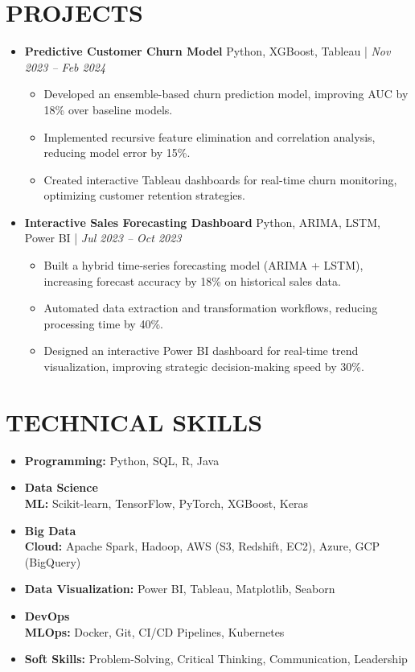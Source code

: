 \documentclass[letterpaper,11pt]{article}
\begin{document}
\section{\textbf{PROJECTS}}
  \begin{itemize}[leftmargin=0.15in, label={}]
    \item \textbf{Predictive Customer Churn Model} \hfill Python, XGBoost, Tableau | \textit{Nov 2023 – Feb 2024}
    \begin{itemize}
        \item Developed an ensemble-based churn prediction model, improving AUC by 18\% over baseline models.
        \item Implemented recursive feature elimination and correlation analysis, reducing model error by 15\%.
        \item Created interactive Tableau dashboards for real-time churn monitoring, optimizing customer retention strategies.
    \end{itemize}
    
    \item \textbf{Interactive Sales Forecasting Dashboard} \hfill Python, ARIMA, LSTM, Power BI | \textit{Jul 2023 – Oct 2023}
    \begin{itemize}
        \item Built a hybrid time-series forecasting model (ARIMA + LSTM), increasing forecast accuracy by 18\% on historical sales data.
        \item Automated data extraction and transformation workflows, reducing processing time by 40\%.
        \item Designed an interactive Power BI dashboard for real-time trend visualization, improving strategic decision-making speed by 30\%.
    \end{itemize}
  \end{itemize}

\section{\textbf{TECHNICAL SKILLS}}
\begin{itemize}[leftmargin=0.15in, label={}]
    \item \textbf{Programming:} Python, SQL, R, Java
    \item \textbf{Data Science \\ ML:} Scikit-learn, TensorFlow, PyTorch, XGBoost, Keras
    \item \textbf{Big Data \\ Cloud:} Apache Spark, Hadoop, AWS (S3, Redshift, EC2), Azure, GCP (BigQuery)
    \item \textbf{Data Visualization:} Power BI, Tableau, Matplotlib, Seaborn
    \item \textbf{DevOps \\ MLOps:} Docker, Git, CI/CD Pipelines, Kubernetes
    \item \textbf{Soft Skills:} Problem-Solving, Critical Thinking, Communication, Leadership
\end{itemize}
\end{document}
